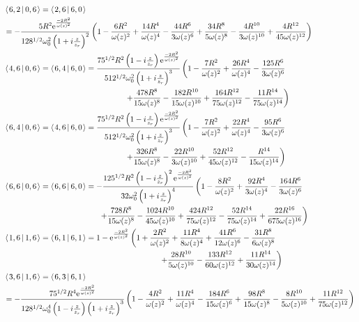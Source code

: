 \documentclass[11pt]{amsart}
\makeatletter
\newcommand{\e}{{\rm e}}				%
\newcommand{\msp}[1]{\mspace{#1mu}}		%
\newcommand{\0}{\varnothing}		%
\newcommand{\brac}[2]{\left\langle\msp{2} #1\left\lvert \msp{3.5} #2 \right.\right\rangle}	%
\newcommand{\1}{!}
\newcommand{\2}{@}
\newcommand{\3}{\#}
\newcommand{\4}{\$}
\newcommand{\5}{\%}
\newcommand{\6}{$^\wedge$}
\newcommand{\7}{\&}
\newcommand{\8}{*}
\newcommand{\9}{(}
\makeatother
\begin{document}
\begin{align*}
&
\brac{6,2}{0,6} = \brac{2,6}{6,0}
\\
&
 =-\frac{5R^2\e^{\frac{-2R^2}{\omega(z)^2}}}{128^{1/2}\omega_0^2\left(1+i\frac{z}{z_r}\right)^2}\left(1-\frac{6R^2}{\omega(z)^2}+\frac{14R^4}{\omega(z)^4}-\frac{44R^6}{3\omega(z)^6}+\frac{34R^8}{5\omega(z)^8}-\frac{4R^{10}}{3\omega(z)^{10}}+\frac{4R^{12}}{45\omega(z)^{12}}\right)
 \\
 &
 \brac{4,6}{0,6} = \brac{6,4}{6,0} =\frac{75^{1/2}R^2\left(1-i\frac{z}{z_r}\right)\e^{\frac{-2R^2}{\omega(z)^2}}}{512^{1/2}\omega_0^2\left(1+i\frac{z}{z_r}\right)^3}\left(1-\frac{7R^2}{\omega(z)^2}+\frac{26R^4}{\omega(z)^4}-\frac{125R^6}{3\omega(z)^6}\right.
 \\
 &
 \msp{280}\left.+\frac{478R^8}{15\omega(z)^8}-\frac{182R^{10}}{15\omega(z)^{10}}+\frac{164R^{12}}{75\omega(z)^{12}}-\frac{11R^{14}}{75\omega(z)^{14}}\right)
 \\
 &
 \brac{6,4}{0,6} = \brac{4,6}{6,0} = \frac{75^{1/2}R^2\left(1-i\frac{z}{z_r}\right)\e^{\frac{-2R^2}{\omega(z)^2}}}{512^{1/2}\omega_0^2\left(1+i\frac{z}{z_r}\right)^3}\left(1-\frac{7R^2}{\omega(z)^2}+\frac{22R^4}{\omega(z)^4}-\frac{95R^6}{3\omega(z)^6}\right.
 \\
 &
\msp{280} \left.+\frac{326R^8}{15\omega(z)^8}-\frac{22R^{10}}{3\omega(z)^{10}}+\frac{52R^{12}}{45\omega(z)^{12}}-\frac{R^{14}}{15\omega(z)^{14}}\right)
\\
&
\brac{6,6}{0,6} = \brac{6,6}{6,0} = -\frac{125^{1/2}R^2\left(1-i\frac{z}{z_r}\right)^2\e^{\frac{-2R^2}{\omega(z)^2}}}{32\omega_0^2\left(1+i\frac{z}{z_r}\right)^4}\left(1-\frac{8R^2}{\omega(z)^2}+\frac{92R^4}{3\omega(z)^4}-\frac{164R^6}{3\omega(z)^6}
\right.
\\
&
\msp{220}\left.+\frac{728R^8}{15\omega(z)^8}-\frac{1024R^{10}}{45\omega(z)^{10}}+\frac{424R^{12}}{75\omega(z)^{12}}-\frac{52R^{14}}{75\omega(z)^{14}}+\frac{22R^{16}}{675\omega(z)^{16}}\right)
\\
&
\brac{1,6}{1,6} = \brac{6,1}{6,1}  =1-\e^{\frac{-2R^2}{\omega(z)^2}}\left(1+\frac{2R^2}{\omega(z)^2}+\frac{11R^4}{8\omega(z)^4}+\frac{41R^6}{12\omega(z)^6}-\frac{31R^8}{6\omega(z)^8}\right.
\\
&
\msp{360}\left.+\frac{28R^{10}}{5\omega(z)^{10}}-\frac{133R^{12}}{60\omega(z)^{12}}+\frac{11R^{14}}{30\omega(z)^{14}}\right)
\\
&
\brac{3,6}{1,6} = \brac{6,3}{6,1} 
\\
&
=-\frac{75^{1/2}R^4\e^{\frac{-2R^2}{\omega(z)^2}}}{128^{1/2}\omega_0^4\left(1-i\frac{z}{z_r}\right)\left(1+i\frac{z}{z_r}\right)^3}\left(1-\frac{4R^2}{\omega(z)^2}+\frac{11R^4}{\omega(z)^4}-\frac{184R^6}{15\omega(z)^6}+\frac{98R^8}{15\omega(z)^8}-\frac{8R^{10}}{5\omega(z)^{10}}+\frac{11R^{12}}{75\omega(z)^{12}}\right)

\end{align*}
\end{document}

